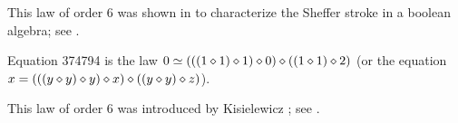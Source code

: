 This law of order $6$ was shown in \cite{mccune_et_al} to characterize the Sheffer stroke in a boolean algebra; see .

\begin{definition}[Equation 374794]
  \leanok
  \label{eq374794}
  Equation 374794 is the law $0  \simeq  (((1 \diamond 1) \diamond 1) \diamond 0) \diamond ((1 \diamond 1) \diamond 2)$ (or the equation $x = (((y \diamond y) \diamond y) \diamond x) \diamond ((y \diamond y) \diamond z)$).
\end{definition}

This law of order $6$ was introduced by Kisielewicz \cite{Kisielewicz}; see .
